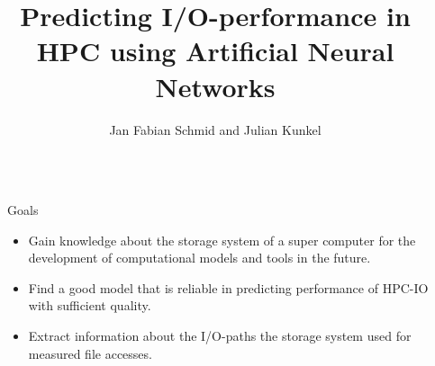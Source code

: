 \documentclass[final]{beamer}
\title{Predicting I/O-performance in HPC using Artificial Neural Networks} %
\author{Jan Fabian Schmid and Julian Kunkel} %
\institute{Universität Hamburg} %
\newlength{\sepwid}
\newlength{\onecolwid}
\begin{document}
	
	\small


\setlength{\belowcaptionskip}{2ex} %
\setlength\belowdisplayshortskip{2ex} %

\begin{frame}[t] %

\begin{columns}[t] %

\begin{column}{\sepwid}\end{column} %

\setlength{\sepwid}{0.02\paperwidth} %

\begin{column}{\onecolwid} %


	\small


\begin{alertblock}{Goals}
	

\begin{itemize}
\item Gain knowledge about the storage system of a super computer for the development of computational models and tools in the future.
\item Find a good model that is reliable in predicting performance of HPC-IO with sufficient quality.
\item Extract information about the I/O-paths the storage system used for measured file accesses.
\end{itemize}


\end{alertblock}
\end{column}
\end{columns}
\end{frame}
\end{document}
